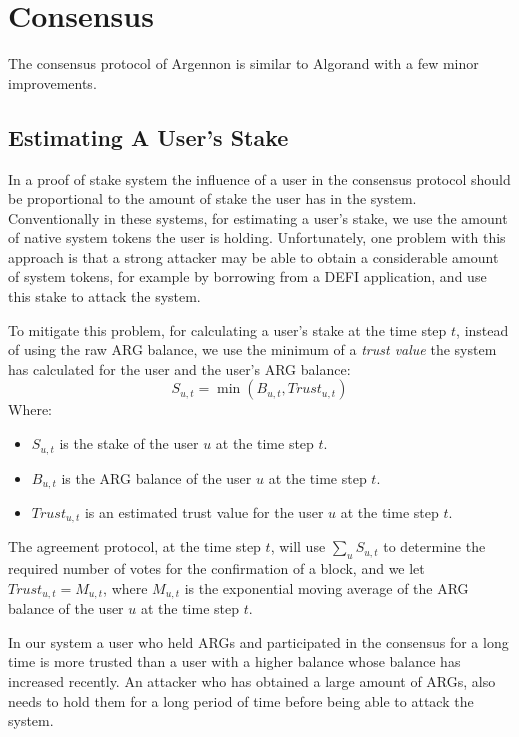 \documentclass[11pt, A4]{report}
\begin{document}
    \section{Consensus}\label{sec:consensus}

    The consensus protocol of Argennon is similar to Algorand with a few minor improvements.

    \subsection{Estimating A User's Stake}\label{subsec:estimating-a-user's-stake}

    In a proof of stake system the influence of a user in the consensus protocol should be proportional to the amount
    of stake the user has in the system. Conventionally in these systems, for estimating a user's stake, we use the
    amount of native system tokens the user is holding. Unfortunately, one problem with this approach is that a
    strong attacker may be able to obtain a considerable amount of system tokens, for example by borrowing from a
    DEFI application, and use this stake to attack the system.

    To mitigate this problem, for calculating a user's stake at the time step \(t\), instead of using the raw ARG
    balance, we use the minimum of a \emph{trust value} the system has calculated for the user and the user's
    ARG balance:
    \[
        S_{u,t} = \min (B_{u,t}, Trust_{u,t})
    \]
    Where:
    \begin{itemize}
        \item \(S_{u,t}\) is the stake of the user \(u\) at the time step \(t\).
        \item \(B_{u,t}\) is the ARG balance of the user \(u\) at the time step \(t\).
        \item \(Trust_{u,t}\) is an estimated trust value for the user \(u\) at the time step \(t\).
    \end{itemize}

    The agreement protocol, at the time step \(t\), will use \(\sum_{u}S_{u,t}\) to determine the required
    number of votes for the confirmation of a block, and we let \(Trust_{u,t} = M_{u,t}\), where \(M_{u,t}\) is the
    exponential moving average of the ARG balance of the user \(u\) at the time step \(t\).

    In our system a user who held ARGs and participated in the consensus for a long time is more trusted
    than a user with a higher balance whose balance has increased recently. An attacker who has obtained a large
    amount of ARGs, also needs to hold them for a long period of time before being able to attack the system.
\end{document}
